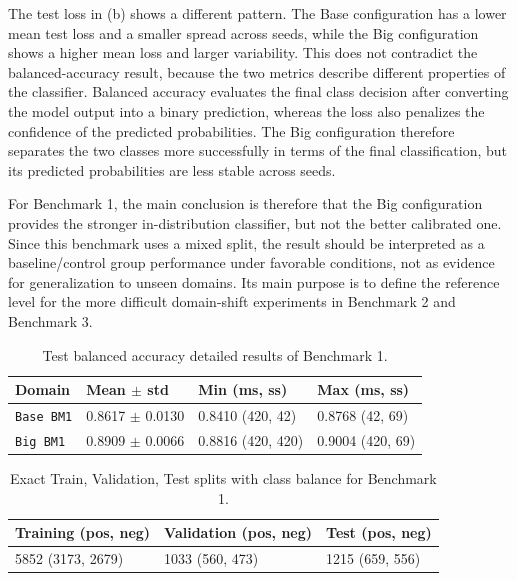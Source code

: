 The test loss in  (b) shows a different pattern. The Base configuration has a lower mean test loss and a smaller spread across seeds, while the Big configuration shows a higher mean loss and larger variability. This does not contradict the balanced-accuracy result, because the two metrics describe different properties of the classifier. Balanced accuracy evaluates the final class decision after converting the model output into a binary prediction, whereas the loss also penalizes the confidence of the predicted probabilities. The Big configuration therefore separates the two classes more successfully in terms of the final classification, but its predicted probabilities are less stable across seeds.

For Benchmark 1, the main conclusion is therefore that the Big configuration provides the stronger in-distribution classifier, but not the better calibrated one. Since this benchmark uses a mixed split, the result should be interpreted as a baseline/control group performance under favorable conditions, not as evidence for generalization to unseen domains. Its main purpose is to define the reference level for the more difficult domain-shift experiments in Benchmark 2 and Benchmark 3.


\begin{table}[htbp]
    \centering
    \caption{Test balanced accuracy detailed results of Benchmark 1.}
    \label{tab:bm1_bal_acc_detail}
    \begin{tabular}{llll}
        \toprule
        \textbf{Domain} & \textbf{Mean $\pm$ std} & \textbf{Min (ms, ss)} & \textbf{Max (ms, ss)}\\
        \midrule

        \texttt{Base BM1} & 0.8617 $\pm$ 0.0130 & 0.8410 (420, 42) & 0.8768 (42, 69)\\
        \texttt{Big BM1} & 0.8909 $\pm$ 0.0066 & 0.8816 (420, 420) & 0.9004 (420, 69) \\
        \bottomrule
    \end{tabular}
\end{table}

\begin{table}[htbp]
    \centering
    \caption{Exact Train, Validation, Test splits with class balance for Benchmark 1.}
    \label{tab:bm1_data_split}
    \begin{tabular}{lll}
        \toprule
        \textbf{Training (pos, neg)} & \textbf{Validation (pos, neg)} & \textbf{Test (pos, neg)}\\
        \midrule

        5852 (3173, 2679) & 1033 (560, 473) & 1215 (659, 556)\\
        \bottomrule
    \end{tabular}
\end{table}
\newpage

